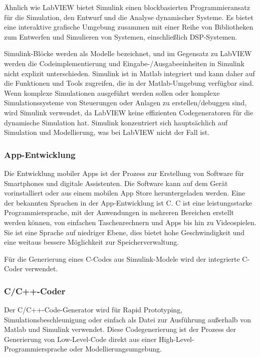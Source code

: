 Ähnlich wie LabVIEW bietet Simulink einen blockbasierten Programmieransatz für die Simulation, den Entwurf und die Analyse dynamischer Systeme. Es bietet eine interaktive grafische Umgebung zusammen mit einer Reihe von Bibliotheken zum Entwerfen und Simulieren von Systemen, einschließlich DSP-Systemen. 

Simulink-Blöcke werden als Modelle bezeichnet, und im Gegensatz zu LabVIEW werden die Codeimplementierung und Eingabe-/Ausgabeeinheiten in Simulink nicht explizit unterschieden. Simulink ist in Matlab integriert und kann daher auf die Funktionen und Tools zugreifen, die in der Matlab-Umgebung verfügbar sind. \citep{Kehtarnavaz2006} \citep{Cansalar2015}\\


Wenn komplexe Simulationen ausgeführt werden sollen oder komplexe Simulationssysteme von Steuerungen oder Anlagen zu erstellen/debuggen sind, wird Simulink verwendet, da LabVIEW keine effizienten Codegeneratoren für die dynamische Simulation hat.
Simulink konzentriert sich hauptsächlich auf Simulation und Modellierung, was bei LabVIEW nicht der Fall ist.


\subsubsection{App-Entwicklung}
Die Entwicklung mobiler Apps ist der Prozess zur Erstellung von Software für Smartphones und digitale Assistenten. Die Software kann auf dem Gerät vorinstalliert oder aus einem mobilen App Store heruntergeladen werden. Eine der bekannten Sprachen in der App-Entwicklung ist C.
C ist eine leistungsstarke Programmiersprache, mit der Anwendungen in mehreren Bereichen erstellt werden können, von einfachen Taschenrechnern und Apps bis hin zu Videospielen. Sie ist eine Sprache auf niedriger Ebene, dies bietet hohe Geschwindigkeit und eine weitaus bessere Möglichkeit zur Speicherverwaltung.

Für die Generierung eines C-Codes aus Simulink-Modele wird der integrierte C-Coder verwendet.

\subsubsection{C/C++-Coder}
Der C/C++-Code-Generator wird für Rapid Prototyping, Simulationsbeschleunigung oder einfach als Datei zur Ausführung außerhalb von Matlab und Simulink verwendet.
Diese Codegenerierung ist der Prozess der Generierung von Low-Level-Code direkt aus einer High-Level-Programmiersprache oder Modellierungsumgebung.

